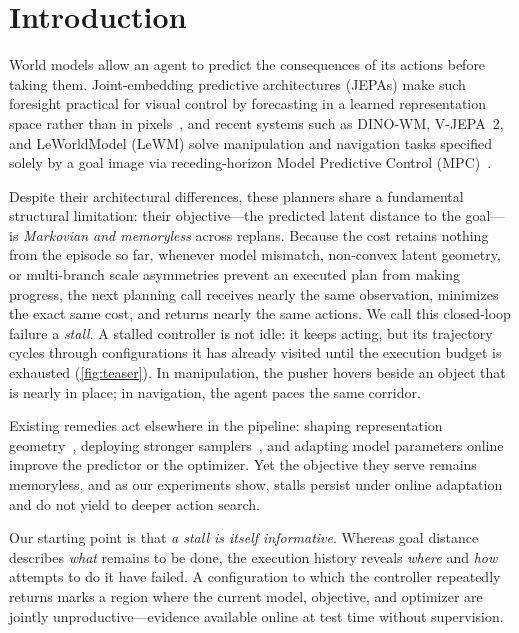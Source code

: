 \section{Introduction}
\label{sec:intro}
World models allow an agent to predict the consequences of its actions before taking them. Joint-embedding predictive architectures (JEPAs) make such foresight practical for visual control by forecasting in a learned representation space rather than in pixels~\cite{assran2023ijepa,bardes2024vjepa}, and recent systems such as DINO-WM, V-JEPA~2, and LeWorldModel (LeWM) solve manipulation and navigation tasks specified solely by a goal image via receding-horizon Model Predictive Control (MPC)~\cite{zhou2025dinowm,assran2025vjepa2,maes2026lewm}.

Despite their architectural differences, these planners share a fundamental structural limitation: their objective---the predicted latent distance to the goal---is \emph{Markovian and memoryless} across replans. Because the cost retains nothing from the episode so far, whenever model mismatch, non-convex latent geometry, or multi-branch scale asymmetries prevent an executed plan from making progress, the next planning call receives nearly the same observation, minimizes the exact same cost, and returns nearly the same actions. We call this closed-loop failure a \emph{stall}. A stalled controller is not idle: it keeps acting, but its trajectory cycles through configurations it has already visited until the execution budget is exhausted (\cref{fig:teaser}). In manipulation, the pusher hovers beside an object that is nearly in place; in navigation, the agent paces the same corridor.

Existing remedies act elsewhere in the pipeline: shaping representation geometry~\cite{wang2026straightening,kang2026anisowm}, deploying stronger samplers~\cite{pinneri2021icem,williams2017mppi}, and adapting model parameters online~\cite{wang2026adajepa,mete2026optta} improve the predictor or the optimizer. Yet the objective they serve remains memoryless, and as our experiments show, stalls persist under online adaptation and do not yield to deeper action search.

Our starting point is that \emph{a stall is itself informative}. Whereas goal distance describes \emph{what} remains to be done, the execution history reveals \emph{where} and \emph{how} attempts to do it have failed. A configuration to which the controller repeatedly returns marks a region where the current model, objective, and optimizer are jointly unproductive---evidence available online at test time without supervision.

